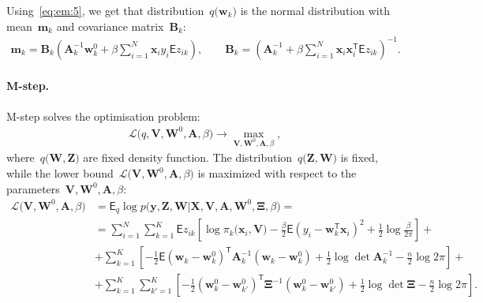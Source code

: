 \documentclass[12pt, twoside]{article}
\numberwithin{equation}{section}
\begin{document}
Using~\eqref{eq:em:5}, we get that distribution~$q\bigr(\mathbf{w}_{k}\bigr)$ is the normal distribution with mean~$\mathbf{m}_{k}$ and covariance matrix~$\mathbf{B}_k$:
\[
\label{eq:em:6}
\begin{aligned}
\mathbf{m}_{k} = \mathbf{B}_{k}\left(\mathbf{A}_{k}^{-1}\mathbf{w}_{k}^{0}+\beta\sum_{i=1}^{N}\mathbf{x}_{i}y_{i}\mathsf{E}z_{ik}\right), \qquad \mathbf{B}_{k} = \left(\mathbf{A}_{k}^{-1}+\beta\sum_{i=1}^{N}\mathbf{x}_{i}\mathbf{x}_{i}^{\mathsf{T}}\mathsf{E}z_{ik}\right)^{-1}.
\end{aligned}
\]

\paragraph{M-step.} M-step solves the optimisation problem:
\[
\label{eq:em:new:3}
\begin{aligned}
\mathcal{L}\bigr(q, \textbf{V}, \textbf{W}^{0}, \textbf{A}, \beta\bigr) \to \max_{\textbf{V}, \textbf{W}^{0}, \textbf{A}, \beta},
\end{aligned}
\]
where~$q\bigr(\textbf{W}, \textbf{Z}\bigr)$ are fixed density function.
The distribution~$q\bigr(\mathbf{Z}, \mathbf{W}\bigr)$ is fixed, while the lower bound~$\mathcal{L}\bigr(\textbf{V}, \textbf{W}^{0}, \textbf{A}, \beta\bigr)$  is maximized with respect to the parameters~$\mathbf{V}, \mathbf{W}^0, \textbf{A},  \beta$:
\[
\label{eq:em:7}
\begin{aligned}
\mathcal{L}\bigr(\textbf{V}, \textbf{W}^{0}, \textbf{A}, \beta\bigr) &= \mathsf{E}_{q}\log p\bigr(\mathbf{y}, \mathbf{Z}, \mathbf{W}|\mathbf{X}, \mathbf{V}, \textbf{A}, \textbf{W}^{0}, \bm{\Xi}, \beta\bigr) =  \\
&= \sum_{i=1}^{N}\sum_{k=1}^{K}\mathsf{E}z_{ik}\left[\log\pi_k\bigr(\textbf{x}_i, \textbf{V}\bigr) - \frac{\beta}{2}\mathsf{E}\left(y_{i} - \textbf{w}_{k}^{\mathsf{T}}\textbf{x}_{i}\right)^{2} + \frac{1}{2}\log\frac{\beta}{2\pi}\right] +\\
&+ \sum_{k=1}^{K}\left[-\frac{1}{2}\mathsf{E}\left(\textbf{w}_{k} - \textbf{w}_{k}^{0}\right)^{\mathsf{T}}\textbf{A}_{k}^{-1}\left(\textbf{w}_{k} - \textbf{w}_{k}^{0}\right) + \frac{1}{2}\log\det\textbf{A}^{-1}_{k} - \frac{n}{2}\log2\pi\right] +\\
&+ \sum_{k=1}^{K}\sum_{k'=1}^{K}\left[-\frac{1}{2}\left(\textbf{w}_{k}^{0}-\textbf{w}_{k'}^{0}\right)^{\mathsf{T}}\bm{\Xi}^{-1}\left(\textbf{w}_{k}^{0}-\textbf{w}_{k'}^{0}\right) +\frac{1}{2}\log\det\bm{\Xi} -\frac{n}{2}\log{2\pi}\right].
\end{aligned}
\]
\end{document}
